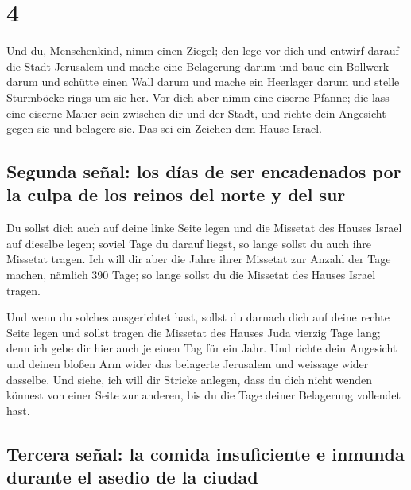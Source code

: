 \hypertarget{section-3}{%
\section{4}\label{section-3}}

 Und du, Menschenkind, nimm einen Ziegel; den lege vor
dich und entwirf darauf die Stadt Jerusalem  und mache
eine Belagerung darum und baue ein Bollwerk darum und schütte einen Wall
darum und mache ein Heerlager darum und stelle Sturmböcke rings um sie
her.  Vor dich aber nimm eine eiserne Pfanne; die lass
eine eiserne Mauer sein zwischen dir und der Stadt, und richte dein
Angesicht gegen sie und belagere sie. Das sei ein Zeichen dem Hause
Israel.

\hypertarget{segunda-seuxf1al-los-duxedas-de-ser-encadenados-por-la-culpa-de-los-reinos-del-norte-y-del-sur}{%
\subsection{Segunda señal: los días de ser encadenados por la culpa de
los reinos del norte y del
sur}\label{segunda-seuxf1al-los-duxedas-de-ser-encadenados-por-la-culpa-de-los-reinos-del-norte-y-del-sur}}

 Du sollst dich auch auf deine linke Seite legen und die
Missetat des Hauses Israel auf dieselbe legen; soviel Tage du darauf
liegst, so lange sollst du auch ihre Missetat tragen.  Ich
will dir aber die Jahre ihrer Missetat zur Anzahl der Tage machen,
nämlich 390 Tage; so lange sollst du die Missetat des Hauses Israel
tragen.

 Und wenn du solches ausgerichtet hast, sollst du darnach
dich auf deine rechte Seite legen und sollst tragen die Missetat des
Hauses Juda vierzig Tage lang; denn ich gebe dir hier auch je einen Tag
für ein Jahr.  Und richte dein Angesicht und deinen bloßen
Arm wider das belagerte Jerusalem und weissage wider dasselbe.
 Und siehe, ich will dir Stricke anlegen, dass du dich
nicht wenden könnest von einer Seite zur anderen, bis du die Tage deiner
Belagerung vollendet hast.

\hypertarget{tercera-seuxf1al-la-comida-insuficiente-e-inmunda-durante-el-asedio-de-la-ciudad}{%
\subsection{Tercera señal: la comida insuficiente e inmunda durante el
asedio de la
ciudad}\label{tercera-seuxf1al-la-comida-insuficiente-e-inmunda-durante-el-asedio-de-la-ciudad}}

